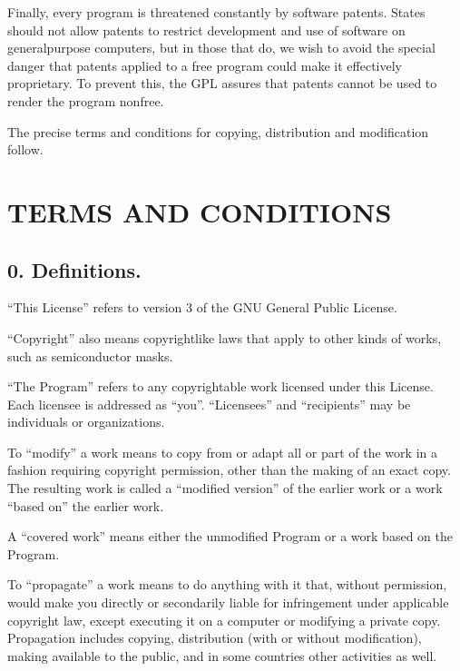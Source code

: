 \documentclass[letterpaper,10pt,english]{sphinxmanual}
\begin{document}
\sphinxAtStartPar
Finally, every program is threatened constantly by software patents.
States should not allow patents to restrict development and use of
software on general\sphinxhyphen{}purpose computers, but in those that do, we wish to
avoid the special danger that patents applied to a free program could
make it effectively proprietary.  To prevent this, the GPL assures that
patents cannot be used to render the program non\sphinxhyphen{}free.

\sphinxAtStartPar
The precise terms and conditions for copying, distribution and
modification follow.


\section{TERMS AND CONDITIONS}
\label{\detokenize{license:terms-and-conditions}}

\subsection{0. Definitions.}
\label{\detokenize{license:definitions}}
\sphinxAtStartPar
“This License” refers to version 3 of the GNU General Public License.

\sphinxAtStartPar
“Copyright” also means copyright\sphinxhyphen{}like laws that apply to other kinds of
works, such as semiconductor masks.

\sphinxAtStartPar
“The Program” refers to any copyrightable work licensed under this
License.  Each licensee is addressed as “you”.  “Licensees” and
“recipients” may be individuals or organizations.

\sphinxAtStartPar
To “modify” a work means to copy from or adapt all or part of the work
in a fashion requiring copyright permission, other than the making of an
exact copy.  The resulting work is called a “modified version” of the
earlier work or a work “based on” the earlier work.

\sphinxAtStartPar
A “covered work” means either the unmodified Program or a work based
on the Program.

\sphinxAtStartPar
To “propagate” a work means to do anything with it that, without
permission, would make you directly or secondarily liable for
infringement under applicable copyright law, except executing it on a
computer or modifying a private copy.  Propagation includes copying,
distribution (with or without modification), making available to the
public, and in some countries other activities as well.
\end{document}
